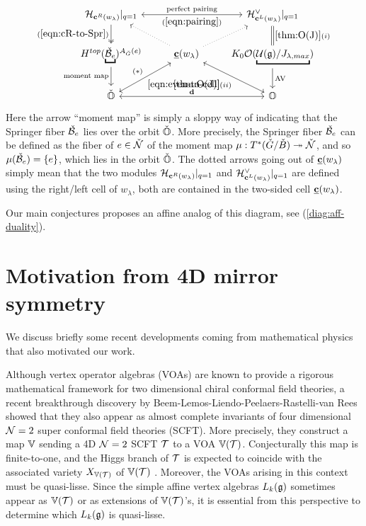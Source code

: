 \documentclass[reqno]{amsart}
\newcommand{\ubar}[1]{\underline{#1}}
\DeclareMathOperator{\AV}{AV}
\begin{document}
\begin{equation}\label{diag:fin-duality}
	\begin{tikzcd}
		\cH_{\bc^R(w_\lambda)}|_{q=1} \ar[d, two heads, "(\ref{eqn:cR-to-Spr})"'] \ar[rr, leftrightarrow, "\text{perfect pairing}", "(\ref{eqn:pairing})"']
		&& \cH_{\bc^L(w_\lambda)}^\vee|_{q=1} \ar[d, equal, "\ref{thm:O(J)}(i)"]
		\\
		H^{top}(\underbracket{\check \cB_e})^{A_{\check G}(e)} \ar[d, "\text{moment map}"']
		& \ubar \bc(w_\lambda) \ar[dl, leftrightarrow, "\ref{eqn:even-to-cell}", "(\ast)"'] \ar[dr, leftrightarrow, "\ref{thm:O(J)}(ii)"'] \ar[ul, dotted] \ar[ur, dotted]
		& K_0 \cO(\underbracket{\cU(\fg)/J_{\lambda,max}}) \ar[d, "\AV"]
		\\		
		\check \BO \ar[rr, leftrightarrow, "\bd"] 
		&& \BO
	\end{tikzcd}
\end{equation}
Here the arrow ``moment map'' is simply a sloppy way of indicating that the Springer fiber $\check {\mathcal{B}}_e$ lies over the orbit $\check {\mathbb{O}}$. More precisely, the Springer fiber $\check {\mathcal{B}}_e$ can be defined as the fiber of $e \in \check {\mathcal{N}}$ of the moment map $\mu:T^* (\check G/ \check B) \twoheadrightarrow \check {\mathcal{N}}$, and so $\mu(\check {\mathcal{B}}_e) = \{e\}$, which lies in the orbit $\check {\mathbb{O}}$. The dotted arrows going out of $\ubar \bc(w_\lambda)$ simply mean that the two modules $\mathcal{H}_{\mathbf{c}^R(w_\lambda)}|_{q=1}$ and $\mathcal{H}_{\mathbf{c}^L(w_\lambda)}^\vee|_{q=1}$ are defined using the right/left cell of $w_\lambda$, both are contained in the two-sided cell $\ubar \bc(w_\lambda)$.

Our main conjectures proposes an affine analog of this diagram, see (\ref{diag:aff-duality}).


\section{Motivation from 4D mirror symmetry}\label{sec:4d}

We discuss briefly some recent developments coming from mathematical physics that also motivated our work. 

Although vertex operator algebras (VOAs) are known to provide a rigorous mathematical framework for two dimensional chiral conformal field theories, a recent breakthrough discovery by Beem-Lemos-Liendo-Peelaers-Rastelli-van Rees \cite{BLLPRvR} showed that they also appear as almost complete invariants of four dimensional $\mathcal{N}=2$ super conformal field theories (SCFT). More precisely, they construct a map $\mathbb{V}$ sending a 4D $\mathcal{N} =2$ SCFT $\mathcal{T}$ to a VOA $\mathbb{V}(\mathcal{T})$. Conjecturally this map is finite-to-one, and the Higgs branch of $\mathcal{T}$ is expected to coincide with the associated variety $X_{\mathbb{V}(\mathcal{T})}$ of $\mathbb{V}(\mathcal{T})$ \cite{Beem-Rasterlli:VOA-Higgs}. Moreover, the VOAs arising in this context must be quasi-lisse. Since the simple affine vertex algebras $L_k(\mathfrak{g})$ sometimes appear as $\mathbb{V}(\mathcal{T})$ or as extensions of $\mathbb{V}(\mathcal{T})$'s, it is essential from this perspective to determine which $L_k(\mathfrak{g})$ is quasi-lisse.
\end{document}
